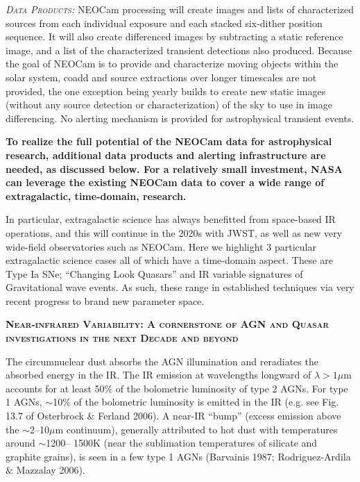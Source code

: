 \documentclass[12pt]{article}
\begin{document}
\smallskip
\smallskip
\noindent
\textsl{\textsc{Data Products:}} NEOCam processing will create images and lists of characterized sources from each individual exposure and each stacked six-dither position sequence. It will also create differenced images by subtracting a static reference image, and a list of the characterized transient detections also produced. Because the goal of NEOCam is to provide and characterize moving objects within the solar system, coadd and source extractions over longer timescales are not provided, the one exception being yearly builds to create new static images (without any source detection or characterization) of the sky to use in image differencing. No alerting mechanism is provided for astrophysical transient events.  

\smallskip
\smallskip
\noindent
{\bf To realize the full potential of the NEOCam data for astrophysical research, additional data products and alerting infrastructure are needed, as discussed below. For a relatively small investment, NASA can leverage the existing NEOCam data to cover a wide range of extragalactic, time-domain, research.}


\smallskip
\smallskip
\noindent
In particular, extragalactic science has always benefitted from space-based IR operations, and this will continue in the 2020s with JWST, as well as new very wide-field observatories such as NEOCam. 
Here we highlight 3 particular extragalactic science cases all of which have a time-domain aspect. These are Type Ia SNe; ``Changing Look Quasars'' and IR variable signatures of Gravitational wave events. As such, these range in established techniques via very recent progress to brand new parameter space. 

\smallskip
\smallskip
\noindent
{\bfseries \textsc{\textcolor{Cerulean}{
Near-infrared Variability: A cornerstone of AGN and Quasar investigations in the next Decade and beyond
}}}


\smallskip
\smallskip
\noindent

The circumnuclear dust absorbs the AGN illumination and reradiates the absorbed energy in the IR. The IR emission at wavelengths longward of $\lambda > 1 \mu$m accounts for at least 50\% of the bolometric luminosity of type 2 AGNs. For type 1 AGNs, $\sim$10\% of the bolometric luminosity is emitted in the IR (e.g. see Fig. 13.7 of Osterbrock \& Ferland 2006). A near-IR ``bump'' (excess emission above the $\sim$2–10$\mu$m continuum), generally attributed to hot dust with temperatures around $\sim$1200– 1500K (near the sublimation temperatures of silicate and graphite grains), is seen in a few type 1 AGNs (Barvainis 1987; Rodriguez-Ardila \& Mazzalay 2006).
\end{document}
